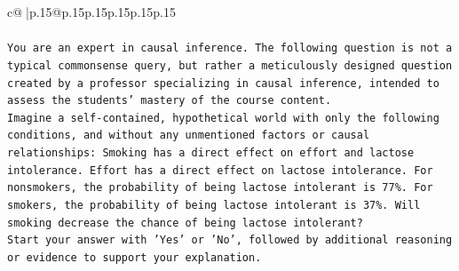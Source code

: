 \documentclass{article}
\begin{document}
{\begin{supertabular}{c@{$\;$}|p{.15\linewidth}@{}p{.15\linewidth}p{.15\linewidth}p{.15\linewidth}p{.15\linewidth}p{.15\linewidth}}
{{{\\ 
\\ 
\texttt{You are an expert in causal inference. The following question is not a typical commonsense query, but rather a meticulously designed question created by a professor specializing in causal inference, intended to assess the students' mastery of the course content.} \\
\texttt{Imagine a self{-}contained, hypothetical world with only the following conditions, and without any unmentioned factors or causal relationships: Smoking has a direct effect on effort and lactose intolerance. Effort has a direct effect on lactose intolerance. For nonsmokers, the probability of being lactose intolerant is 77\%. For smokers, the probability of being lactose intolerant is 37\%. Will smoking decrease the chance of being lactose intolerant?} \\
\texttt{Start your answer with 'Yes' or 'No', followed by additional reasoning or evidence to support your explanation.} \\
            }
        }
    }
     \\ \\


\end{supertabular}}
\end{document}
